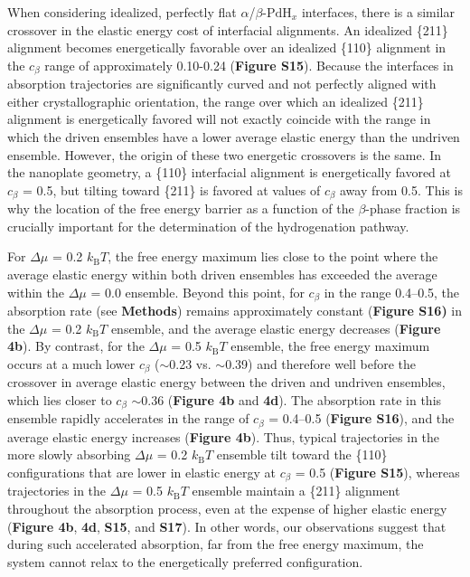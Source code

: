 \documentclass[reprint,amsmath,amssymb,aip,nofootinbib, citeautoscript,]{revtex4-2}
\begin{document}
When considering idealized, perfectly flat $\alpha$/$\beta$-$\mathrm{PdH}_x$ interfaces, there is a similar crossover in the elastic energy cost of interfacial alignments. An idealized \{211\} alignment becomes energetically favorable over an idealized \{110\} alignment in the $c_\beta$ range of approximately 0.10-0.24 (\textbf{Figure S15}). Because the interfaces in absorption trajectories are significantly curved and not perfectly aligned with either crystallographic orientation, the range over which an idealized \{211\} alignment is energetically favored will not exactly coincide with the range in which the driven ensembles have a lower average elastic energy than the undriven ensemble. However, the origin of these two energetic crossovers is the same. In the nanoplate geometry, a \{110\} interfacial alignment is energetically favored at $c_\beta$ = 0.5, but tilting toward \{211\} is favored at values of $c_\beta$ away from 0.5. This is why the location of the free energy barrier as a function of the $\beta$-phase fraction is crucially important for the determination of the hydrogenation pathway.


For $\Delta$$\mu$ = 0.2 $k_\mathrm{B}T$, the free energy maximum lies close to the point where the average elastic energy within both driven ensembles has exceeded the average within the $\Delta$$\mu$ = 0.0 ensemble. Beyond this point, for $c_\beta$ in the range 0.4–0.5, the absorption rate (see \textbf{Methods}) remains approximately constant (\textbf{Figure S16)} in the $\Delta$$\mu$ = 0.2 $k_\mathrm{B}T$ ensemble, and the average elastic energy decreases (\textbf{Figure 4b}). By contrast, for the $\Delta$$\mu$ = 0.5 $k_\mathrm{B}T$ ensemble, the free energy maximum occurs at a much lower $c_\beta$ ($\sim$0.23 vs. $\sim$0.39) and therefore well before the crossover in average elastic energy between the driven and undriven ensembles, which lies closer to $c_\beta$ $\sim$0.36 (\textbf{Figure 4b} and \textbf{4d}). The absorption rate in this ensemble rapidly accelerates in the range of $c_\beta$ = 0.4–0.5 (\textbf{Figure S16}), and the average elastic energy increases (\textbf{Figure 4b}). Thus, typical trajectories in the more slowly absorbing $\Delta$$\mu$ = 0.2 $k_\mathrm{B}T$ ensemble tilt toward the \{110\} configurations that are lower in elastic energy at $c_\beta$ = 0.5 (\textbf{Figure S15}), whereas trajectories in the $\Delta$$\mu$ = 0.5 $k_\mathrm{B}T$ ensemble maintain a \{211\} alignment throughout the absorption process, even at the expense of higher elastic energy (\textbf{Figure 4b}, \textbf{4d}, \textbf{S15}, and \textbf{S17}). In other words, our observations suggest that during such accelerated absorption, far from the free energy maximum, the system cannot relax to the energetically preferred configuration.
\end{document}
